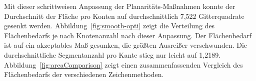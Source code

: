 \documentclass[a4paper]{scrreprt}
\theoremstyle{definition}
\begin{document}
Mit dieser schrittweisen Anpassung der Planaritäts-Maßnahmen konnte der Durchschnitt der Fläche pro Konten auf durchschnittlich 7,522 Gitterquadrate gesenkt werden. Abbildung~\ref{fig:smooth-opti} zeigt die Verteilung des Flächenbedarfs je nach Knotenanzahl nach dieser Anpassung. Der Flächenbedarf ist auf ein akzeptables Maß gesunken, die größten Ausreißer verschwunden. Die durchschnittliche Segmentanzahl pro Kante stieg nur leicht auf 1,2189. Abbildung~\ref{fig:areaComparison} zeigt einen zusammenfassenden Vergleich des Flächenbedarfs der verschiedenen Zeichenmethoden.







\end{document}
